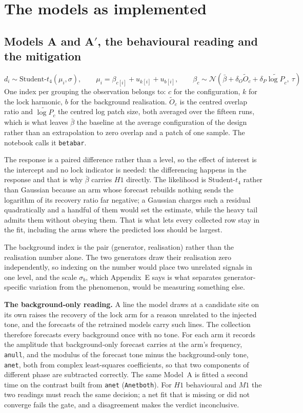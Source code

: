 \documentclass[10pt,a4paper]{article}
\newcommand{\code}[1]{\texttt{\UseBreakableUnderscores #1}}
\newcommand{\UseBreakableUnderscores}{\def\_{\textunderscore\allowbreak}}
\begin{document}
\section{The models as implemented}
\subsection{Models A and A$'$, the behavioural reading and the mitigation}
\[
d_i\sim\text{Student-}t_4(\mu_i,\sigma),\qquad \mu_i=\beta_{c[i]}+u_{k[i]}+u_{b[i]},\qquad \beta_c\sim\mathcal N(\bar\beta+\delta_O\widetilde O_c+\delta_P\widetilde{\log P}_c,\ \tau)
\]
One index per grouping the observation belongs to: $c$ for the configuration, $k$ for the lock harmonic, $b$ for the background realisation. $\widetilde O_c$ is the centred overlap ratio and $\widetilde{\log P}_c$ the centred log patch size, both averaged over the fifteen runs, which is what leaves $\bar\beta$ the baseline at the average configuration of the design rather than an extrapolation to zero overlap and a patch of one sample. The notebook calls it \code{beta\_bar}.

The response is a paired difference rather than a level, so the effect of interest is the intercept and no lock indicator is needed: the differencing happens in the response and that is why $\bar\beta$ carries $H1$ directly. The likelihood is Student-$t_4$ rather than Gaussian because an arm whose forecast rebuilds nothing sends the logarithm of its recovery ratio far negative; a Gaussian charges such a residual quadratically and a handful of them would set the estimate, while the heavy tail admits them without obeying them. That is what lets every collected row stay in the fit, including the arms where the predicted loss should be largest.

The background index is the pair (generator, realisation) rather than the realisation number alone. The two generators draw their realisation zero independently, so indexing on the number would place two unrelated signals in one level, and the scale $\sigma_b$, which Appendix~E says is what separates generator-specific variation from the phenomenon, would be measuring something else.

\textbf{The background-only reading.} A line the model draws at a candidate site on its own raises the recovery of the lock arm for a reason unrelated to the injected tone, and the forecasts of the retrained models carry such lines. The collection therefore forecasts every background once with no tone. For each arm it records the amplitude that background-only forecast carries at the arm's frequency, \code{a\_null}, and the modulus of the forecast tone minus the background-only tone, \code{a\_net}, both from complex least-squares coefficients, so that two components of different phase are subtracted correctly. The same Model~A is fitted a second time on the contrast built from \code{a\_net} (\code{A\_net\_both}). For $H1$ behavioural and $M1$ the two readings must reach the same decision; a net fit that is missing or did not converge fails the gate, and a disagreement makes the verdict inconclusive.
\end{document}
